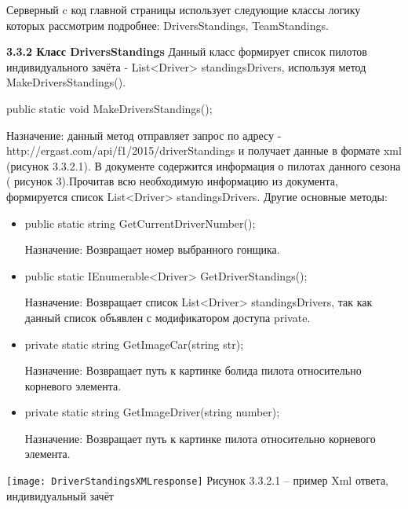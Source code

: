 \documentclass[14pt,a4paper]{extreport}
\begin{document}
\flushleft\parindent=1cm Серверный c код главной страницы использует следующие классы логику которых рассмотрим подробнее: DriversStandings, TeamStandings.\par
	\flushleft\hspace{4ex}\textbf{3.3.2 Класс DriversStandings}
\flushleft\hspace{4ex}Данный класс формирует список пилотов индивидуального зачёта - List<Driver> standingsDrivers, используя метод MakeDriversStandings().\par
 
\flushleft\hspace{4ex}public static void MakeDriversStandings();\par
\hspace{4ex}Назначение: данный метод отправляет запрос по адресу - http://ergast.com/api/f1/2015/driverStandings и получает данные в формате xml (рисунок 3.3.2.1). В документе содержится информация о пилотах данного сезона ( рисунок 3).Прочитав всю необходимую информацию из документа, формируется список List<Driver> standingsDrivers. Другие основные методы:\par
 \begin{itemize}
\item public static string GetCurrentDriverNumber();\par
Назначение: Возвращает номер выбранного гонщика.\par
\item public static IEnumerable<Driver> GetDriverStandings();\par
Назначение: Возвращает список List<Driver> standingsDrivers, так как данный список объявлен с модификатором доступа private.\par
\item private static string GetImageCar(string str);\par
Назначение: Возвращает путь к картинке болида пилота относительно корневого элемента.\par
\item private static string GetImageDriver(string number);\par
Назначение: Возвращает путь к картинке пилота относительно корневого элемента.\par
\end{itemize}
	\texttt{[image: DriverStandingsXMLresponse]}   
           \center Рисунок 3.3.2.1 – пример Xml ответа, индивидуальный зачёт \par
\end{document}
